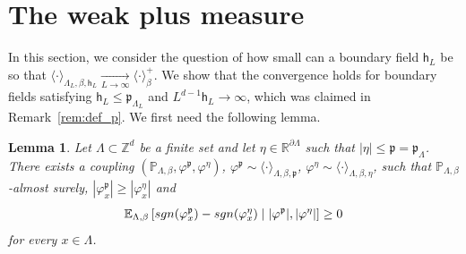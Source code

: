 \documentclass[11pt,a4paper]{article}
\newtheorem{lemma}[theorem]{Lemma}
\theoremstyle{definition}
\numberwithin{equation}{section}
\begin{document}
\section{The weak plus measure}

In this section, we consider the question of how small can a boundary field $\mathsf{h}_L$ be so that $\langle \cdot \rangle_{\Lambda_L,\beta,\mathsf{h}_L}\underset{L\to\infty}{\longrightarrow} \langle \cdot \rangle^+_\beta$. We show that the convergence holds for boundary fields satisfying $\mathsf{h}_L\leq \mathfrak{p}_{\Lambda_L}$ and $L^{d-1}\mathsf{h}_L\to\infty$, which was claimed in Remark~\ref{rem:def_p}. We first need the following lemma.


\begin{lemma}\label{lem: coupling lemma}
Let $\Lambda\subset \mathbb{Z}^d$ be a finite set and let $\eta\in \mathbb{R}^{\partial \Lambda}$ such that $|\eta|\leq \mathfrak{p}=\mathfrak{p}_{\Lambda}$. There exists a coupling $(\mathbb{P}_{\Lambda,\beta},\varphi^\mathfrak{p},\varphi^{\eta})$, $\varphi^\mathfrak{p}\sim \langle \cdot \rangle_{\Lambda,\beta,\mathfrak{p}}$, $\varphi^{\eta}\sim \langle \cdot \rangle_{\Lambda,\beta,\eta}$, such that $\mathbb{P}_{\Lambda,\beta}$-almost surely, $|\varphi^\mathfrak{p}_x|\geq |\varphi^{\eta}_x|$ and
\begin{equation}
 \mathbb{E}_{\Lambda,\beta}\left[\textup{sgn}(\varphi^\mathfrak{p}_x)-\textup{sgn}(\varphi^{\eta}_x) \mid |\varphi^\mathfrak{p}|,|\varphi^{\eta}|\right]
\geq 0
\end{equation}
for every $x\in \Lambda$.
\end{lemma}
\end{document}
